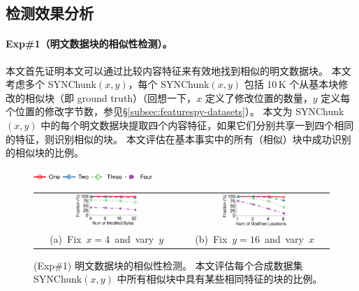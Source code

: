 \subsection{检测效果分析}
\label{subsec:featurespy-evaluation-detection}



\paragraph*{Exp\#1（明文数据块的相似性检测）。}
本文首先证明本文可以通过比较内容特征来有效地找到相似的明文数据块。 本文考虑多个 SYNChunk$(x, y)$，每个 SYNChunk$(x, y)$ 包括 10\,K 个从基本块修改的相似块（即 ground truth）（回想一下，$x$ 定义了修改位置的数量，$y$ 定义每个位置的修改字节数，参见\S\ref{subsec:featurespy-datasets}）。 本文为 SYNChunk$(x, y)$ 中的每个明文数据块提取四个内容特征，如果它们分别共享一到四个相同的特征，则识别相似的块。 本文评估在基本事实中的所有（相似）块中成功识别的相似块的比例。


\begin{figure}[t]
    \centering
    \includegraphics[width=0.4\textwidth]{pic/featurespy/plot/detection/syn/fixed_pq_legend.pdf}
    \vspace{5pt}\\
    \begin{tabular}{@{\ }c@{\ }c}
        \includegraphics[width=0.45\textwidth]{pic/featurespy/plot/detection/syn/fixed_p_4.pdf} &
        \includegraphics[width=0.45\textwidth]{pic/featurespy/plot/detection/syn/fixed_q_16.pdf}\\
        \mbox{\small (a) Fix $x=4$ and vary $y$}&
        \mbox{\small (b) Fix $y=16$ and vary $x$}\\
    \end{tabular}
    \vspace{-6pt}
    \caption{(Exp\#1) 明文数据块的相似性检测。 本文评估每个合成数据集 SYNChunk$(x, y)$ 中所有相似块中具有某些相同特征的块的比例。}
    \vspace{-6pt}
    \label{fig:featurespy-expDetectionSynSim}
\end{figure}

